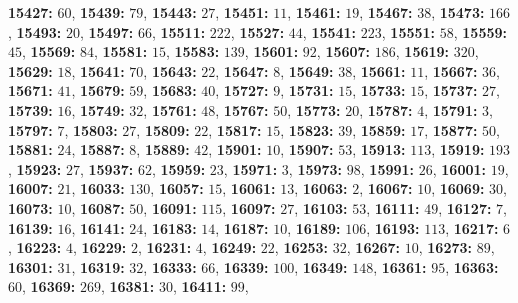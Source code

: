 \textsf{\bfseries 15427:} $60$, \textsf{\bfseries 15439:} $79$, \textsf{\bfseries 15443:} $27$, \textsf{\bfseries 15451:} $11$, \textsf{\bfseries 15461:} $19$, \textsf{\bfseries 15467:} $38$, \textsf{\bfseries 15473:} $166$, \textsf{\bfseries 15493:} $20$, \textsf{\bfseries 15497:} $66$, \textsf{\bfseries 15511:} $222$, \textsf{\bfseries 15527:} $44$, \textsf{\bfseries 15541:} $223$, \textsf{\bfseries 15551:} $58$, \textsf{\bfseries 15559:} $45$, \textsf{\bfseries 15569:} $84$, \textsf{\bfseries 15581:} $15$, \textsf{\bfseries 15583:} $139$, \textsf{\bfseries 15601:} $92$, \textsf{\bfseries 15607:} $186$, \textsf{\bfseries 15619:} $320$, \textsf{\bfseries 15629:} $18$, \textsf{\bfseries 15641:} $70$, \textsf{\bfseries 15643:} $22$, \textsf{\bfseries 15647:} $8$, \textsf{\bfseries 15649:} $38$, \textsf{\bfseries 15661:} $11$, \textsf{\bfseries 15667:} $36$, \textsf{\bfseries 15671:} $41$, \textsf{\bfseries 15679:} $59$, \textsf{\bfseries 15683:} $40$, \textsf{\bfseries 15727:} $9$, \textsf{\bfseries 15731:} $15$, \textsf{\bfseries 15733:} $15$, \textsf{\bfseries 15737:} $27$, \textsf{\bfseries 15739:} $16$, \textsf{\bfseries 15749:} $32$, \textsf{\bfseries 15761:} $48$, \textsf{\bfseries 15767:} $50$, \textsf{\bfseries 15773:} $20$, \textsf{\bfseries 15787:} $4$, \textsf{\bfseries 15791:} $3$, \textsf{\bfseries 15797:} $7$, \textsf{\bfseries 15803:} $27$, \textsf{\bfseries 15809:} $22$, \textsf{\bfseries 15817:} $15$, \textsf{\bfseries 15823:} $39$, \textsf{\bfseries 15859:} $17$, \textsf{\bfseries 15877:} $50$, \textsf{\bfseries 15881:} $24$, \textsf{\bfseries 15887:} $8$, \textsf{\bfseries 15889:} $42$, \textsf{\bfseries 15901:} $10$, \textsf{\bfseries 15907:} $53$, \textsf{\bfseries 15913:} $113$, \textsf{\bfseries 15919:} $193$, \textsf{\bfseries 15923:} $27$, \textsf{\bfseries 15937:} $62$, \textsf{\bfseries 15959:} $23$, \textsf{\bfseries 15971:} $3$, \textsf{\bfseries 15973:} $98$, \textsf{\bfseries 15991:} $26$, \textsf{\bfseries 16001:} $19$, \textsf{\bfseries 16007:} $21$, \textsf{\bfseries 16033:} $130$, \textsf{\bfseries 16057:} $15$, \textsf{\bfseries 16061:} $13$, \textsf{\bfseries 16063:} $2$, \textsf{\bfseries 16067:} $10$, \textsf{\bfseries 16069:} $30$, \textsf{\bfseries 16073:} $10$, \textsf{\bfseries 16087:} $50$, \textsf{\bfseries 16091:} $115$, \textsf{\bfseries 16097:} $27$, \textsf{\bfseries 16103:} $53$, \textsf{\bfseries 16111:} $49$, \textsf{\bfseries 16127:} $7$, \textsf{\bfseries 16139:} $16$, \textsf{\bfseries 16141:} $24$, \textsf{\bfseries 16183:} $14$, \textsf{\bfseries 16187:} $10$, \textsf{\bfseries 16189:} $106$, \textsf{\bfseries 16193:} $113$, \textsf{\bfseries 16217:} $6$, \textsf{\bfseries 16223:} $4$, \textsf{\bfseries 16229:} $2$, \textsf{\bfseries 16231:} $4$, \textsf{\bfseries 16249:} $22$, \textsf{\bfseries 16253:} $32$, \textsf{\bfseries 16267:} $10$, \textsf{\bfseries 16273:} $89$, \textsf{\bfseries 16301:} $31$, \textsf{\bfseries 16319:} $32$, \textsf{\bfseries 16333:} $66$, \textsf{\bfseries 16339:} $100$, \textsf{\bfseries 16349:} $148$, \textsf{\bfseries 16361:} $95$, \textsf{\bfseries 16363:} $60$, \textsf{\bfseries 16369:} $269$, \textsf{\bfseries 16381:} $30$, \textsf{\bfseries 16411:} $99$, 
